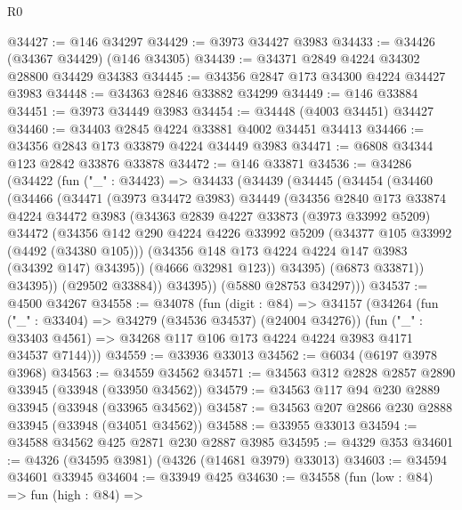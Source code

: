 \begin{lexlean}{R0}
\begin{coremodule}
@34427 := @146 @34297
@34429 := @3973 @34427 @3983
@34433 := @34426 (@34367 @34429) (@146 @34305)
@34439 := @34371 @2849 @4224 @34302 @28800 @34429 @34383
@34445 := @34356 @2847 @173 @34300 @4224 @34427 @3983
@34448 := @34363 @2846 @33882 @34299
@34449 := @146 @33884
@34451 := @3973 @34449 @3983
@34454 := @34448 (@4003 @34451) @34427
@34460 := @34403 @2845 @4224 @33881 @4002 @34451 @34413
@34466 := @34356 @2843 @173 @33879 @4224 @34449 @3983
@34471 := @6808 @34344 @123 @2842 @33876 @33878
@34472 := @146 @33871
@34536 := @34286
    (@34422
      (fun ("_" : @34423) =>
      @34433
        (@34439
          (@34445
            (@34454
              (@34460
                (@34466
                  (@34471
                    (@3973 @34472 @3983)
                    @34449
                    (@34356
                      @2840
                      @173
                      @33874
                      @4224
                      @34472
                      @3983
                      (@34363
                        @2839
                        @4227
                        @33873
                        (@3973 @33992 @5209)
                        @34472
                        (@34356
                          @142
                          @290
                          @4224
                          @4226
                          @33992
                          @5209
                          (@34377 @105 @33992 (@4492 (@34380 @105)))
                          (@34356 @148 @173 @4224 @4224 @147 @3983 (@34392 @147) @34395))
                        (@4666 @32981 @123))
                      @34395)
                    (@6873 @33871))
                  @34395))
              (@29502 @33884))
            @34395))
        (@5880 @28753 @34297)))
@34537 := @4500 @34267
@34558 := @34078
    (fun (digit : @84) =>
    @34157
      (@34264
        (fun ("_" : @33404) => @34279 (@34536 @34537) (@24004 @34276))
        (fun ("_" : @33403 @4561) => @34268 @117 @106 @173 @4224 @4224 @3983 @4171 @34537 @7144)))
@34559 := @33936 @33013
@34562 := @6034 (@6197 @3978 @3968)
@34563 := @34559 @34562
@34571 := @34563 @312 @2828 @2857 @2890 @33945 (@33948 (@33950 @34562))
@34579 := @34563 @117 @94 @230 @2889 @33945 (@33948 (@33965 @34562))
@34587 := @34563 @207 @2866 @230 @2888 @33945 (@33948 (@34051 @34562))
@34588 := @33955 @33013
@34594 := @34588 @34562 @425 @2871 @230 @2887 @3985
@34595 := @4329 @353
@34601 := @4326 (@34595 @3981) (@4326 (@14681 @3979) @33013)
@34603 := @34594 @34601 @33945
@34604 := @33949 @425
@34630 := @34558
    (fun (low : @84) =>
    fun (high : @84) =>

\end{coremodule}
\end{lexlean}
